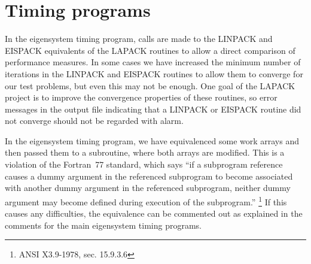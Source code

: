 \documentclass[11pt]{report}
\begin{document}
\section{Timing programs}

In the eigensystem timing program, calls are made to the LINPACK
and EISPACK equivalents of the LAPACK routines to allow a direct
comparison of performance measures.
In some cases we have increased the minimum number of
iterations in the LINPACK and EISPACK routines to allow
them to converge for our test problems, but
even this may not be enough.
One goal of the LAPACK project is to improve the convergence
properties of these routines, so error messages in the output
file indicating that a LINPACK or EISPACK routine did not
converge should not be regarded with alarm.

In the eigensystem timing program, we have equivalenced some work
arrays and then passed them to a subroutine, where both arrays are
modified.  This is a violation of the Fortran~77 standard, which
says ``if a subprogram reference causes a dummy argument in the
referenced subprogram to become associated with another dummy
argument in the referenced subprogram, neither dummy argument may
become defined during execution of the subprogram.''
\footnote{ ANSI X3.9-1978, sec. 15.9.3.6}
If this causes any difficulties, the equivalence
can be commented out as explained in the comments for the main
eigensystem timing programs.

%
%
\end{document}
